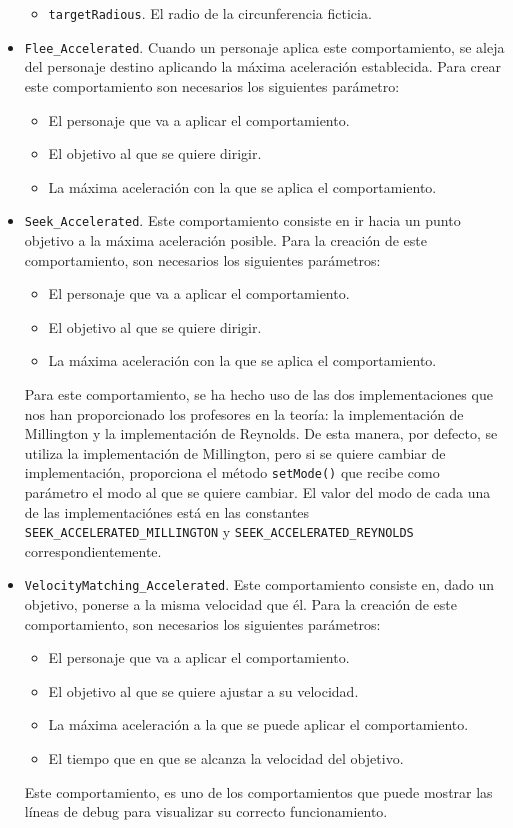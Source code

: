 \begin{itemize}
 \begin{itemize}
 	\item \texttt{targetRadious}. El radio de la circunferencia ficticia.
 \end{itemize}
 \item \texttt{Flee\_Accelerated}. Cuando un personaje aplica este comportamiento, se aleja del personaje destino aplicando la máxima aceleración establecida. Para crear este comportamiento son necesarios los siguientes parámetro:
 \begin{itemize}
 	\item El personaje que va a aplicar el comportamiento.
  	\item El objetivo al que se quiere dirigir.
  	\item La máxima aceleración con la que se aplica el comportamiento.
 \end{itemize} 
 \item \texttt{Seek\_Accelerated}. Este comportamiento consiste en ir hacia un punto objetivo a la máxima aceleración posible. Para la creación de este comportamiento, son necesarios los siguientes parámetros:
 \begin{itemize}
  \item El personaje que va a aplicar el comportamiento.
  \item El objetivo al que se quiere dirigir.
  \item La máxima aceleración con la que se aplica el comportamiento.
 \end{itemize}
 Para este comportamiento, se ha hecho uso de las dos implementaciones que nos han proporcionado los profesores en la teoría: la implementación de Millington y la implementación de Reynolds. De esta manera, por defecto, se utiliza la implementación de Millington, pero si se quiere cambiar de implementación, proporciona el método \texttt{setMode()} que recibe como parámetro el modo al que se quiere cambiar. El valor del modo de cada una de las implementaciónes está en las constantes \texttt{SEEK\_ACCELERATED\_MILLINGTON} y \texttt{SEEK\_ACCELERATED\_REYNOLDS} correspondientemente.
 
 
 \item \texttt{VelocityMatching\_Accelerated}. Este comportamiento consiste en, dado un objetivo, ponerse a la misma velocidad que él. Para la creación de este comportamiento, son necesarios los siguientes parámetros:
 \begin{itemize}
  \item El personaje que va a aplicar el comportamiento.
  \item El objetivo al que se quiere ajustar a su velocidad.
  \item La máxima aceleración a la que se puede aplicar el comportamiento.
  \item El tiempo que en que se alcanza la velocidad del objetivo.
 \end{itemize}
 Este comportamiento, es uno de los comportamientos que puede mostrar las líneas de debug para visualizar su correcto funcionamiento. 
\end{itemize}

